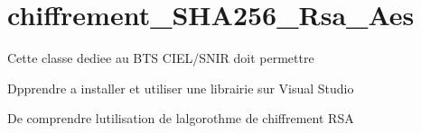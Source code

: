 \chapter{chiffrement\+\_\+\+SHA256\+\_\+\+Rsa\+\_\+\+Aes}
\hypertarget{index}{}\label{index}
Cette classe dediee au BTS CIEL/\+SNIR doit permettre \begin{DoxyItemize}
\item D\textquotesingle{}pprendre a installer et utiliser une librairie sur Visual Studio \item De comprendre l\textquotesingle{}utilisation de l\textquotesingle{}algorothme de chiffrement RSA \end{DoxyItemize}

